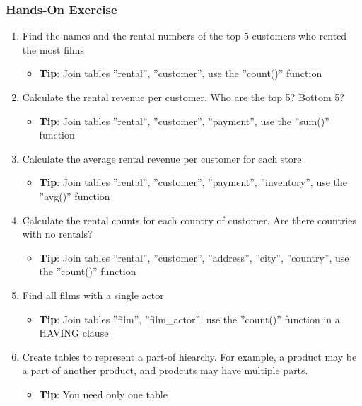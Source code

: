 \begin{tcolorbox}[colback=code]
\subsubsection*{Hands-On Exercise}
\begin{enumerate}
  \item Find the names and the rental numbers of the top 5 customers who rented the most films
  \begin{itemize}
    \item \textbf{Tip}: Join tables ''rental'', ''customer'', use the ''count()'' function
  \end{itemize}
  \item Calculate the rental revenue per customer. Who are the top 5? Bottom 5?
  \begin{itemize}
    \item \textbf{Tip}: Join tables ''rental'', ''customer'', ''payment'', use the ''sum()'' function
  \end{itemize}
  \item Calculate the average rental revenue per customer for each store
  \begin{itemize}
    \item \textbf{Tip}: Join tables ''rental'', ''customer'', ''payment'', ''inventory'', use the ''avg()'' function
  \end{itemize}
  \item Calculate the rental counts for each country of customer. Are there countries with no rentals?
  \begin{itemize}
    \item \textbf{Tip}: Join tables ''rental'', ''customer'', ''address'', ''city'', ''country'', use the ''count()'' function
  \end{itemize}
  \item Find all films with a single actor
  \begin{itemize}
    \item \textbf{Tip}: Join tables ''film'', ''film\_actor'', use the ''count()'' function in a HAVING clause
  \end{itemize}
  \item Create tables to represent a part-of hiearchy. For example, a product may be a part of another product, and prodcuts may have multiple parts.
  \begin{itemize}
    \item \textbf{Tip}: You need only one table
  \end{itemize}
\end{enumerate}
\end{tcolorbox}

